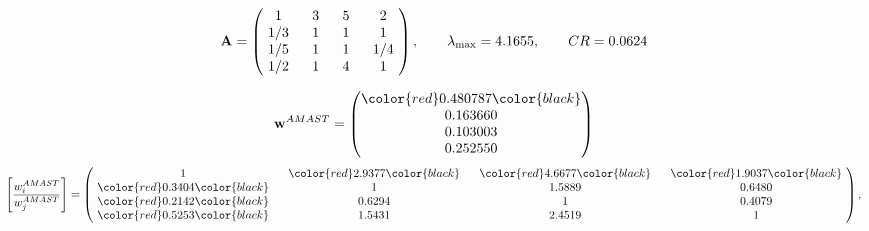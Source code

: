 \begin{example}
\begin{equation*}
\mathbf{A} =
\begin{pmatrix}
$\,\,$ 1 $\,\,$ & $\,\,$3$\,\,$ & $\,\,$5$\,\,$ & $\,\,$2 $\,\,$ \\
$\,\,$ 1/3$\,\,$ & $\,\,$ 1 $\,\,$ & $\,\,$1$\,\,$ & $\,\,$1 $\,\,$ \\
$\,\,$ 1/5$\,\,$ & $\,\,$ 1 $\,\,$ & $\,\,$ 1 $\,\,$ & $\,\,$ 1/4 $\,\,$ \\
$\,\,$ 1/2$\,\,$ & $\,\,$ 1 $\,\,$ & $\,\,$4$\,\,$ & $\,\,$ 1  $\,\,$ \\
\end{pmatrix},
\qquad
\lambda_{\max} =
4.1655,
\qquad
CR = 0.0624
\end{equation*}

\begin{equation*}
\mathbf{w}^{AMAST} =
\begin{pmatrix}
\color{red} 0.480787\color{black} \\
0.163660\\
0.103003\\
0.252550
\end{pmatrix}\end{equation*}
\begin{equation*}
\left[ \frac{{w}^{AMAST}_i}{{w}^{AMAST}_j} \right] =
\begin{pmatrix}
$\,\,$ 1 $\,\,$ & $\,\,$\color{red} 2.9377\color{black} $\,\,$ & $\,\,$\color{red} 4.6677\color{black} $\,\,$ & $\,\,$\color{red} 1.9037\color{black} $\,\,$ \\
$\,\,$\color{red} 0.3404\color{black} $\,\,$ & $\,\,$ 1 $\,\,$ & $\,\,$1.5889$\,\,$ & $\,\,$0.6480  $\,\,$ \\
$\,\,$\color{red} 0.2142\color{black} $\,\,$ & $\,\,$0.6294$\,\,$ & $\,\,$ 1 $\,\,$ & $\,\,$0.4079 $\,\,$ \\
$\,\,$\color{red} 0.5253\color{black} $\,\,$ & $\,\,$1.5431$\,\,$ & $\,\,$2.4519$\,\,$ & $\,\,$ 1  $\,\,$ \\
\end{pmatrix},
\end{equation*}


\end{example}
